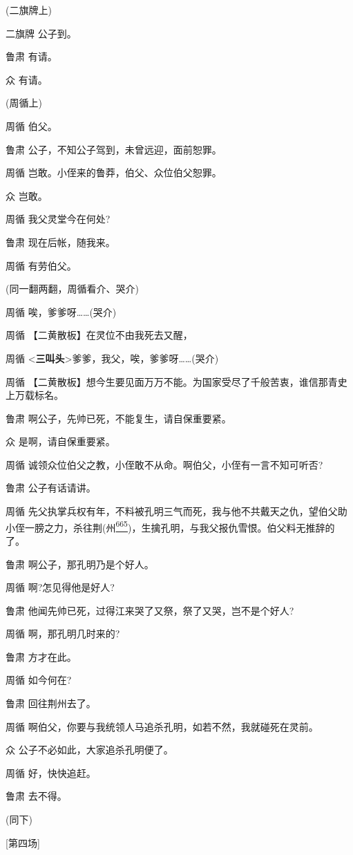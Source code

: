 (二旗牌上)

二旗牌 公子到。

鲁肃 有请。

众 有请。

(周循上)

周循 伯父。

鲁肃 公子，不知公子驾到，未曾远迎，面前恕罪。

周循 岂敢。小侄来的鲁莽，伯父、众位伯父恕罪。

众 岂敢。

周循 我父灵堂今在何处?

鲁肃 现在后帐，随我来。

周循 有劳伯父。

(同一翻两翻，周循看介、哭介)

周循 唉，爹爹呀\ldots{}\ldots{}(哭介)

周循 【二黄散板】在灵位不由我死去又醒，

周循
\textless{}\textbf{三叫头}\textgreater{}爹爹，我父，唉，爹爹呀\ldots{}\ldots{}(哭介)

周循
【二黄散板】想今生要见面万万不能。为国家受尽了千般苦衷，谁信那青史上万载标名。

鲁肃 啊公子，先帅已死，不能复生，请自保重要紧。

众 是啊，请自保重要紧。

周循 诚领众位伯父之教，小侄敢不从命。啊伯父，小侄有一言不知可听否?

鲁肃 公子有话请讲。

周循
先父执掌兵权有年，不料被孔明三气而死，我与他不共戴天之仇，望伯父助小侄一膀之力，杀往荆(州\protect\hyperlink{fn665}{\textsuperscript{665}})，生擒孔明，与我父报仇雪恨。伯父料无推辞的了。

鲁肃 啊公子，那孔明乃是个好人。

周循 啊?怎见得他是好人?

鲁肃 他闻先帅已死，过得江来哭了又祭，祭了又哭，岂不是个好人?

周循 啊，那孔明几时来的?

鲁肃 方才在此。

周循 如今何在?

鲁肃 回往荆州去了。

周循 啊伯父，你要与我统领人马追杀孔明，如若不然，我就碰死在灵前。

众 公子不必如此，大家追杀孔明便了。

周循 好，快快追赶。

鲁肃 去不得。

(同下)

{[}第四场{]}

